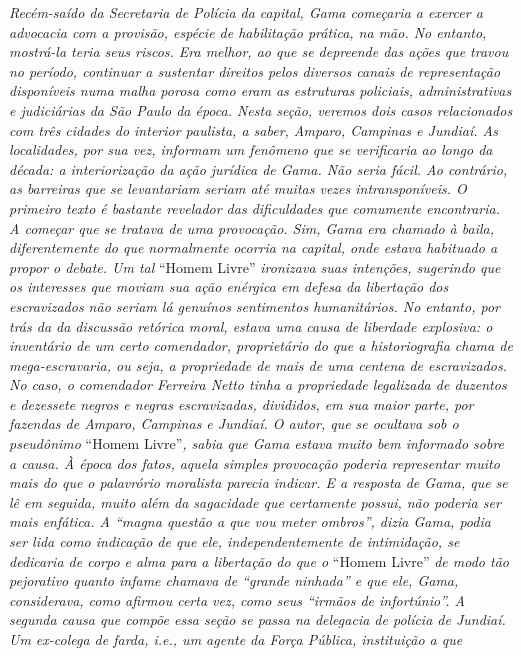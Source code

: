 \begin{argumento}
\emph{Recém-saído da Secretaria de Polícia da capital, Gama começaria a
exercer a advocacia com a provisão, espécie de habilitação prática, na
mão. No entanto, mostrá-la teria seus riscos. Era melhor, ao que se
depreende das ações que travou no período, continuar a sustentar
direitos pelos diversos canais de representação disponíveis numa malha
porosa como eram as estruturas policiais, administrativas e judiciárias
da São Paulo da época. Nesta seção, veremos dois casos relacionados com
três cidades do interior paulista, a saber, Amparo, Campinas e Jundiaí.
As localidades, por sua vez, informam um fenômeno que se verificaria ao
longo da década: a interiorização da ação jurídica de Gama. Não seria
fácil. Ao contrário, as barreiras que se levantariam seriam até muitas
vezes intransponíveis. O primeiro texto é bastante revelador das
dificuldades que comumente encontraria. A começar que se tratava de uma
provocação. Sim, Gama era chamado à baila, diferentemente do que
normalmente ocorria na capital, onde estava habituado a propor o debate.
Um tal} ``Homem Livre'' \emph{ironizava suas intenções, sugerindo que os
interesses que moviam sua ação enérgica em defesa da libertação dos
escravizados não seriam lá genuínos sentimentos humanitários. No
entanto, por trás da da discussão retórica moral, estava uma causa de
liberdade explosiva: o inventário de um certo comendador, proprietário
do que a historiografia chama de mega-escravaria, ou seja, a propriedade
de mais de uma centena de escravizados. No caso, o comendador Ferreira
Netto tinha a propriedade legalizada de duzentos e dezessete negros e
negras escravizadas, divididos, em sua maior parte, por fazendas de
Amparo, Campinas e Jundiaí. O autor, que se ocultava sob o pseudônimo}
``Homem Livre''\emph{, sabia que Gama estava muito bem informado sobre a
causa. À época dos fatos, aquela simples provocação poderia representar
muito mais do que o palavrório moralista parecia indicar. E a resposta
de Gama, que se lê em seguida, muito além da sagacidade que certamente
possui, não poderia ser mais enfática. A ``magna questão a que vou meter
ombros'', dizia Gama, podia ser lida como indicação de que ele,
independentemente de intimidação, se dedicaria de corpo e alma para a
libertação do que o} ``Homem Livre'' \emph{de modo tão pejorativo quanto
infame chamava de ``grande ninhada'' e que ele, Gama, considerava, como
afirmou certa vez, como seus ``irmãos de infortúnio''. A segunda causa que
compõe essa seção se passa na delegacia de polícia de Jundiaí. Um
ex-colega de farda, i.e., um agente da Força Pública, instituição a que
}
\end{argumento}
